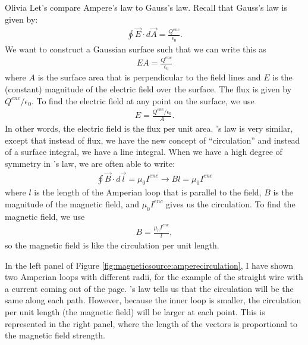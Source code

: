 \begin{studentOpinion}{Olivia}
Let's compare Ampere's law to Gauss's law. Recall that Gauss's law is given by:
\begin{align*}
\oint \vec{E}\cdot d\vec{A}=\frac{Q^{enc}}{\epsilon_0}.
\end{align*}
We want to construct a Gaussian surface such that we can write this as 
\begin{align*}
EA=\frac{Q^{enc}}{\epsilon_0}
\end{align*}
where $A$ is the surface area that is perpendicular to the field lines and $E$ is the (constant) magnitude of the electric field over the surface. The flux is given by $Q^{enc}/\epsilon_0$. To find the electric field at any point on the surface, we use
\begin{align*}
E=\frac{Q^{enc}/\epsilon_0}{A}.
\end{align*}
In other words, the electric field is the flux per unit area. \ampere's law is very similar, except that instead of flux, we have the new concept of ``circulation'' and instead of a surface integral, we have a line integral. When we have a high degree of symmetry in \ampere's law, we are often able to write:
\begin{align*}
\oint \vec{B}\cdot d\vec{l}=\mu_0 I^{enc}\rightarrow Bl=\mu_0 I^{enc}
\end{align*}
where $l$ is the length of the Amperian loop that is parallel to the field, $B$ is the magnitude of the magnetic field, and $\mu_0 I^{enc}$ gives us the circulation. To find the magnetic field, we use
\begin{align*}
B=\frac{\mu_0 I^{enc}}{l},
\end{align*}
so the magnetic field is like the circulation per unit length.

In the left panel of Figure \ref{fig:magneticsource:amperecirculation}, I have shown two Amperian loops with different radii, for the example of the straight wire with a current coming out of the page. \ampere's law tells us that the circulation will be the same along each path. However, because the inner loop is smaller, the circulation per unit length (the magnetic field) will be larger at each point. This is represented in the right panel, where the length of the vectors is proportional to the magnetic field strength.  


\end{studentOpinion}


